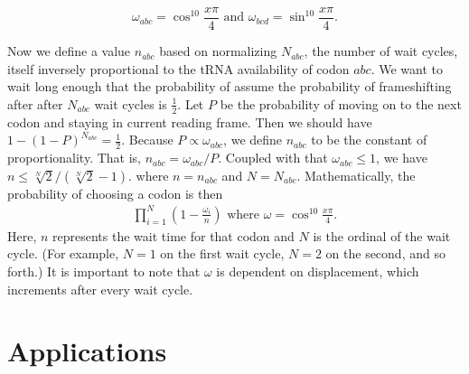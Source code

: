 \documentclass[12pt, draft]{article}
\numberwithin{equation}{section}
\begin{document}
\begin{equation}
  \omega_{abc} = \cos^{10}{\frac{x\pi}{4}} \text{ and } \omega_{bcd} = \sin^{10}{\frac{x\pi}{4}}.
\end{equation}

Now we define a value $n_{abc}$ based on normalizing $N_{abc}$, the
number of wait cycles, itself inversely proportional to the
tRNA availability of codon $abc$.
We want to wait long enough that the probability of assume the probability of frameshifting after
after $N_{abc}$ wait cycles is $\frac{1}{2}$.  Let $P$ be the
probability of moving on to the next codon and staying in current reading
frame.  Then we should have $1-\left(1-P\right)^{N_{abc}} =
\frac{1}{2}$.  Because $P \propto \omega_{abc}$, we define $n_{abc}$ to be the constant of
proportionality. That is, $n_{abc} = \omega_{abc} / P$.  Coupled
with that $\omega_{abc} \le 1$, we have $n \le \sqrt[N]{2}/(\sqrt[N]{2} - 1).$
where $n = n_{abc}$ and $N = N_{abc}$. Mathematically, the probability of choosing a codon is then
\begin{align}
  \prod_{i=1}^N \left(1-\frac{\omega_i}{n}\right) \text{ where } \omega = \cos^{10}{\frac{x\pi}{4}}.
\end{align}
Here, $n$ represents the wait time for that codon and $N$ is the ordinal of the wait cycle. (For example,
$N=1$ on the first wait cycle, $N=2$ on the second, and so forth.)
It is important to note that $\omega$ is dependent on displacement, 
which increments after every wait cycle.

\section{Applications}
\end{document}
